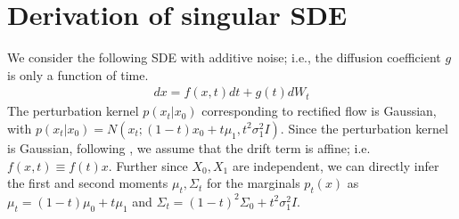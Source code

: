 \section{Derivation of singular SDE}
\label{sec:singular_sde_app}

We consider the following SDE with additive noise; i.e., the diffusion coefficient $g$ is only a function of time.
\begin{align}
dx = f(x, t)dt + g(t)dW_t
\end{align}
The perturbation kernel $p(x_t | x_0)$ corresponding to rectified flow is Gaussian, with $p(x_t | x_0) = N(x_t; (1-t)x_0+t\mu_1, t^2\sigma_1^2I)$.
Since the perturbation kernel is Gaussian, following \citet{song2020score}, we assume that the drift term is affine; i.e. $f(x, t) \equiv f(t)x$. 
Further since $X_0, X_1$ are independent, we can directly infer the first and second moments $\mu_t, \Sigma_t$ for the marginals $p_t(x)$ as $\mu_t =  (1-t)\mu_0 + t\mu_1$ and $\Sigma_t = (1-t)^2\Sigma_0 + t^2\sigma_1^2I$.

